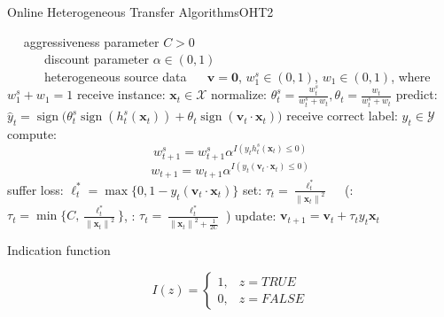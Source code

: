 \documentclass{beamer}
\DeclareMathOperator{\sign}{sign}
\begin{document}
\begin{frame}{Online Heterogeneous Transfer Algorithms}{OHT2}
\begin{algorithm}[H]
\begin{algorithmic}[1]
\caption{OHT2}
\tiny
\REQUIRE ~~
aggressiveness parameter $C>0$\\ 
~~~~~~discount parameter $\alpha \in (0,1)$\\ 
~~~~~~heterogeneous source data 
\ENSURE ~~
$\mathbf{v} = \mathbf{0}$, $w_{1}^{s} \in (0,1)$, $w_{1} \in (0,1)$, where $w_{1}^{s} + w_1 = 1$
\STATE 
  receive instance: $\mathbf{x}_t \in \mathcal{X}$
\STATE
  normalize: $\theta_{t}^{s} = \frac{w_{t}^{s}}{w_{t}^{s}+w_t}, \theta_{t} = \frac{w_{t}}{w_{t}^{s}+w_t}$
\STATE
  predict: $\hat{y}_t = \sign \big( \theta_{t}^{s} \sign (h_{t}^{s}(\mathbf{x}_t)) + \theta_{t} \sign (\mathbf{v}_t \cdot \mathbf{x}_t) \big)$
\STATE
  receive correct label: $y_t \in \mathcal{Y}$
\STATE
  compute: 
    $$w_{t+1}^{s} = w_{t+1}^{s} \alpha ^ {I(y_t h_{t}^{s}(\mathbf{x}_t) \leq 0)}  $$
    $$w_{t+1} = w_{t+1} \alpha ^ {I(y_t (\mathbf{v}_t \cdot \mathbf{x}_t) \leq 0)}  $$
\STATE
  suffer loss: $\ell_{t}^{*} = \max \{0, 1-y_t(\mathbf{v}_t \cdot \mathbf{x}_t)\}$
\STATE
  set: $\tau_t = \frac{\ell_{t}^{*}}{{\|\mathbf{x}_t\|}^2}$
	~~(\uppercase\expandafter{}: $\tau_t = \min \{ C, \frac{\ell_{t}^{*}}{{\|\mathbf{x}_t\|}^2} \} $, 
	\uppercase\expandafter{}: $ \tau_t = \frac{\ell_{t}^{*}}{{\|\mathbf{x}_t\|}^2 + \frac{1}{2C}} $ )
\STATE
  update: $ \mathbf{v}_{t+1} = \mathbf{v}_t + \tau_t y_t \mathbf{x}_t $
\ENDFOR
\end{algorithmic}
\end{algorithm}
\begin{footnotesize}
Indication function
\end{footnotesize}
\begin{scriptsize}
\begin{equation*}
I(z) = 
\begin{cases}
1, & z = TRUE \\
0, & z = FALSE
\end{cases}
\end{equation*}
\end{scriptsize}
\end{frame}
\end{document}
